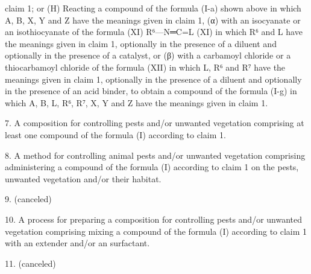 \documentclass[11pt,a4paper]{article}
\begin{document}
claim 1; or (H) Reacting a compound of the formula (I-a) shown above in which A, B, X, Y and Z have the meanings given in claim 1, (α) with an isocyanate or an isothiocyanate of the formula (XI) R⁶—N═C=L (XI) in which R⁶ and L have the meanings given in claim 1, optionally in the presence of a diluent and optionally in the presence of a catalyst, or (β) with a carbamoyl chloride or a thiocarbamoyl chloride of the formula (XII) in which L, R⁶ and R⁷ have the meanings given in claim 1, optionally in the presence of a diluent and optionally in the presence of an acid binder, to obtain a compound of the formula (I-g) in which A, B, L, R⁶, R⁷, X, Y and Z have the meanings given in claim 1.

7. A composition for controlling pests and/or unwanted vegetation comprising at least one compound of the formula (I) according to claim 1.

8. A method for controlling animal pests and/or unwanted vegetation comprising administering a compound of the formula (I) according to claim 1 on the pests, unwanted vegetation and/or their habitat.

9. (canceled)

10. A process for preparing a composition for controlling pests and/or unwanted vegetation comprising mixing a compound of the formula (I) according to claim 1 with an extender and/or an surfactant.

11. (canceled)
\end{document}
